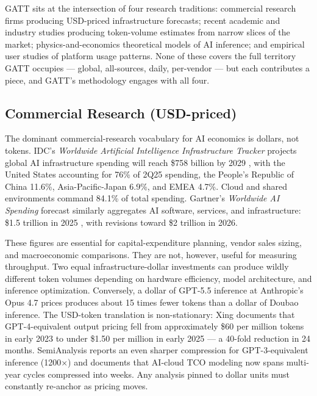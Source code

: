 \documentclass[11pt,a4paper]{article}
\begin{document}
GATT sits at the intersection of four research traditions: commercial research firms producing USD-priced infrastructure forecasts; recent academic and industry studies producing token-volume estimates from narrow slices of the market; physics-and-economics theoretical models of AI inference; and empirical user studies of platform usage patterns. None of these covers the full territory GATT occupies --- global, all-sources, daily, per-vendor --- but each contributes a piece, and GATT's methodology engages with all four.

\subsection{Commercial Research (USD-priced)}

The dominant commercial-research vocabulary for AI economics is dollars, not tokens. IDC's \emph{Worldwide Artificial Intelligence Infrastructure Tracker} projects global AI infrastructure spending will reach \$758 billion by 2029 \cite{idc2025infrastructure}, with the United States accounting for 76\% of 2Q25 spending, the People's Republic of China 11.6\%, Asia-Pacific-Japan 6.9\%, and EMEA 4.7\%. Cloud and shared environments command 84.1\% of total spending. Gartner's \emph{Worldwide AI Spending} forecast similarly aggregates AI software, services, and infrastructure: \$1.5 trillion in 2025 \cite{gartner2025aispending}, with revisions toward \$2 trillion in 2026.

These figures are essential for capital-expenditure planning, vendor sales sizing, and macroeconomic comparisons. They are not, however, useful for measuring throughput. Two equal infrastructure-dollar investments can produce wildly different token volumes depending on hardware efficiency, model architecture, and inference optimization. Conversely, a dollar of GPT-5.5 inference at Anthropic's Opus 4.7 prices produces about 15 times fewer tokens than a dollar of Doubao inference. The USD-token translation is non-stationary: Xing \cite{xing2026token} documents that GPT-4-equivalent output pricing fell from approximately \$60 per million tokens in early 2023 to under \$1.50 per million in early 2025 --- a 40-fold reduction in 24 months. SemiAnalysis \cite{patel2026semianalysis} reports an even sharper compression for GPT-3-equivalent inference (1200×) and documents that AI-cloud TCO modeling now spans multi-year cycles compressed into weeks. Any analysis pinned to dollar units must constantly re-anchor as pricing moves.
\end{document}
